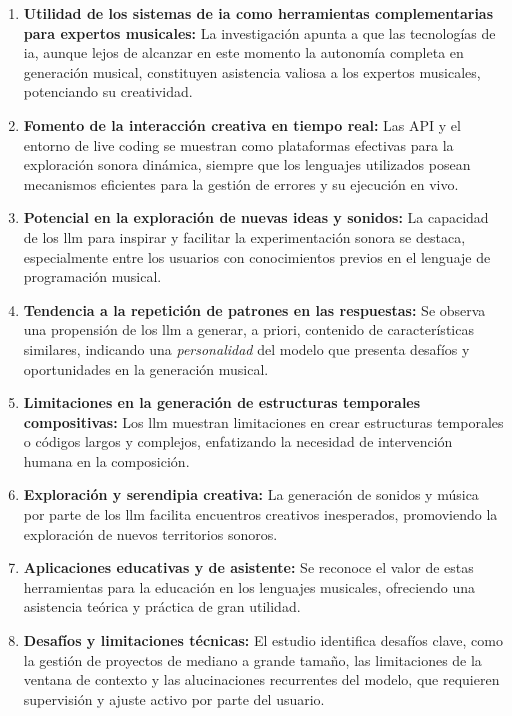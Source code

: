 \begin{enumerate}
    \item \textbf{Utilidad de los sistemas de \gls{ia} como herramientas complementarias para expertos musicales:} La investigación apunta a que las tecnologías de \gls{ia}, aunque lejos de alcanzar en este momento la autonomía completa en generación musical, constituyen asistencia valiosa a los expertos musicales, potenciando su creatividad.
    \item \textbf{Fomento de la interacción creativa en tiempo real:} Las API y el entorno de live coding se muestran como plataformas efectivas para la exploración sonora dinámica, siempre que los lenguajes utilizados posean mecanismos eficientes para la gestión de errores y su ejecución en vivo.
    \item \textbf{Potencial en la exploración de nuevas ideas y sonidos:} La capacidad de los \gls{llm} para inspirar y facilitar la experimentación sonora se destaca, especialmente entre los usuarios con conocimientos previos en el lenguaje de programación musical.
    \item \textbf{Tendencia a la repetición de patrones en las respuestas:} Se observa una propensión de los \gls{llm} a generar, a priori, contenido de características similares, indicando una \emph{personalidad} del modelo que presenta desafíos y oportunidades en la generación musical.
    \item \textbf{Limitaciones en la generación de estructuras temporales compositivas:} Los \gls{llm} muestran limitaciones en crear estructuras temporales o códigos largos y complejos, enfatizando la necesidad de intervención humana en la composición.
    \item \textbf{Exploración y serendipia creativa:} La generación de sonidos y música por parte de los \gls{llm} facilita encuentros creativos inesperados, promoviendo la exploración de nuevos territorios sonoros.
    \item \textbf{Aplicaciones educativas y de asistente:} Se reconoce el valor de estas herramientas para la educación en los lenguajes musicales, ofreciendo una asistencia teórica y práctica de gran utilidad.
    \item \textbf{Desafíos y limitaciones técnicas:} El estudio identifica desafíos clave, como la gestión de proyectos de mediano a grande tamaño, las limitaciones de la ventana de contexto y las alucinaciones recurrentes del modelo, que requieren supervisión y ajuste activo por parte del usuario.
\end{enumerate}


